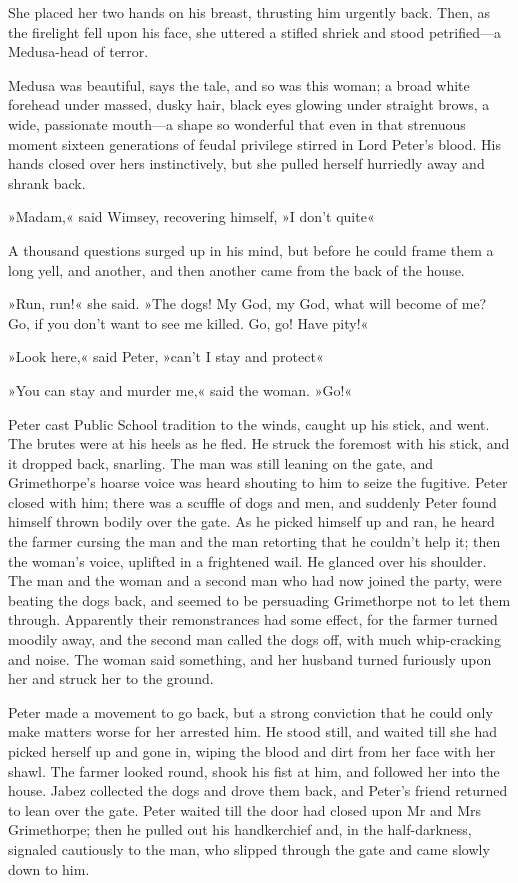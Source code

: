 She placed her two hands on his breast, thrusting him urgently back.  Then, as the firelight fell upon his face, she uttered a stifled shriek and stood petrified\allowbreak---\allowbreak a Medusa-head of terror.

Medusa was beautiful, says the tale, and so was this woman; a broad white forehead under massed, dusky hair, black eyes glowing under straight brows, a wide, passionate mouth\allowbreak---\allowbreak a shape so wonderful that even in that strenuous moment sixteen generations of feudal privilege stirred in Lord Peter's blood. His hands closed over hers instinctively, but she pulled herself hurriedly away and shrank back.

»Madam,« said Wimsey, recovering himself, »I don't quite\longdash«

A thousand questions surged up in his mind, but before he could frame them a long yell, and another, and then another came from the back of the house.

»Run, run!« she said. »The dogs! My God, my God, what will become of me? Go, if you don't want to see me killed. Go, go! Have pity!«

»Look here,« said Peter, »can't I stay and protect\longdash«

»You can stay and murder me,« said the woman. »Go!«

Peter cast Public School tradition to the winds, caught up his stick, and went. The brutes were at his heels as he fled. He struck the foremost with his stick, and it dropped back, snarling. The man was still leaning on the gate, and Grimethorpe's hoarse voice was heard shouting to him to seize the fugitive. Peter closed with him; there was a scuffle of dogs and men, and suddenly Peter found himself thrown bodily over the gate. As he picked himself up and ran, he heard the farmer cursing the man and the man retorting that he couldn't help it; then the woman's voice, uplifted in a frightened wail. He glanced over his shoulder. The man and the woman and a second man who had now joined the party, were beating the dogs back, and seemed to be persuading Grimethorpe not to let them through. Apparently their remonstrances had some effect, for the farmer turned moodily away, and the second man called the dogs off, with much whip-cracking and noise. The woman said something, and her husband turned furiously upon her and struck her to the ground.

Peter made a movement to go back, but a strong conviction that he could only make matters worse for her arrested him. He stood still, and waited till she had picked herself up and gone in, wiping the blood and dirt from her face with her shawl. The farmer looked round, shook his fist at him, and followed her into the house. Jabez collected the dogs and drove them back, and Peter's friend returned to lean over the gate.
Peter waited till the door had closed upon Mr and Mrs Grimethorpe; then he pulled out his handkerchief and, in the half-darkness, signaled cautiously to the man, who slipped through the gate and came slowly down to him.


